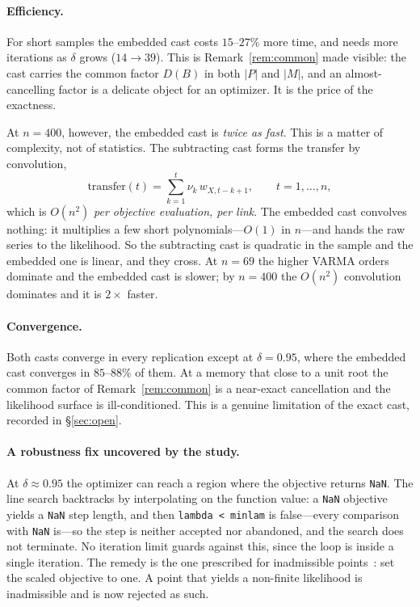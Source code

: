 \documentclass[11pt,a4paper]{article}
\theoremstyle{plain}
\theoremstyle{remark}
\begin{document}
\paragraph{Efficiency.} For short samples the embedded cast costs $15$--$27\%$ more
time, and needs more iterations as $\delta$ grows ($14\to39$). This is
Remark~\ref{rem:common} made visible: the cast carries the common factor $D(B)$ in
both $|P|$ and $|M|$, and an almost-cancelling factor is a delicate object for an
optimizer. It is the price of the exactness.

At $n=400$, however, the embedded cast is \emph{twice as fast}. This is a matter of
complexity, not of statistics. The subtracting cast forms the transfer by
convolution,
\[
\text{transfer}(t)=\sum_{k=1}^{t}\nu_k\,w_{X,t-k+1},\qquad t=1,\dots,n,
\]
which is $O(n^2)$ \emph{per objective evaluation, per link}. The embedded cast
convolves nothing: it multiplies a few short polynomials---$O(1)$ in $n$---and hands
the raw series to the likelihood. So the subtracting cast is quadratic in the sample
and the embedded one is linear, and they cross. At $n=69$ the higher VARMA orders
dominate and the embedded cast is slower; by $n=400$ the $O(n^2)$ convolution
dominates and it is $2\times$ faster.

\paragraph{Convergence.} Both casts converge in every replication except at
$\delta=0.95$, where the embedded cast converges in $85$--$88\%$ of them. At a memory
that close to a unit root the common factor of Remark~\ref{rem:common} is a
near-exact cancellation and the likelihood surface is ill-conditioned. This is a
genuine limitation of the exact cast, recorded in \S\ref{sec:open}.

\paragraph{A robustness fix uncovered by the study.} At $\delta\approx0.95$ the
optimizer can reach a region where the objective returns \texttt{NaN}. The line
search backtracks by interpolating on the function value: a \texttt{NaN} objective
yields a \texttt{NaN} step length, and then \texttt{lambda < minlam} is false---every
comparison with \texttt{NaN} is---so the step is neither accepted nor abandoned, and
the search does not terminate. No iteration limit guards against this, since the loop
is inside a single iteration. The remedy is the one prescribed for inadmissible
points~\cite{mauricio1997}: set the scaled objective to one. A point that yields a
non-finite likelihood is inadmissible and is now rejected as such.
\end{document}
